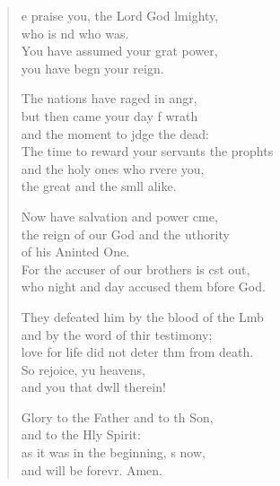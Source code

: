 \begin{verse}
  \begin{patverse}
e praise you, the Lord God lmighty,\Med\\
who is nd who was.\\
You have assumed your grat power,\Med\\
you have begn your reign.

The nations have raged in angr,\Flex\\
but then came your day f wrath\Med\\
and the moment to jdge the dead:\\
The time to reward your servants the prophts\Flex\\
and the holy ones who rvere you,\Med\\
the great and the smll alike.

Now have salvation and power cme,\Flex\\
the reign of our God and the uthority\Med\\
of his Aninted One.\\
For the accuser of our brothers is cst out,\Med\\
who night and day accused them bfore God.

They defeated him by the blood of the Lmb\Flex\\
and by the word of thir testimony;\Med\\
love for life did not deter thm from death.\\
So rejoice, yu heavens,\Med\\
and you that dwll therein!

Glory to the Father and to th Son,\Med\\
and to the Hly Spirit:\\
as it was in the beginning, s now,\Med\\
and will be forevr. Amen. 
  \end{patverse}
\end{verse}
